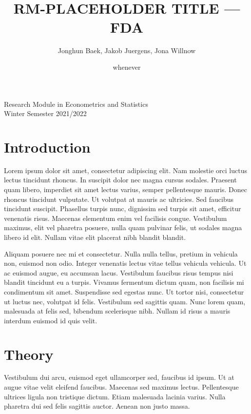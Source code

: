 \documentclass[11pt,twoside,a4paper]{article}
\begin{document}
	\title{{\LARGE RM-PLACEHOLDER TITLE — FDA}}
	\author{Jonghun Baek, Jakob Juergens, Jona Willnow}
	\date{whenever}
	\maketitle
	\vspace{2.5 cm}
	\begin{center}
		Research Module in Econometrics and Statistics \\
		Winter Semester 2021/2022
	\end{center}
	
	\newpage
	
	\tableofcontents
	
	\newpage
	
	\section{Introduction}
	Lorem ipsum dolor sit amet, consectetur adipiscing elit. Nam molestie orci luctus lectus tincidunt rhoncus. In suscipit dolor nec magna cursus sodales. Praesent quam libero, imperdiet sit amet lectus varius, semper pellentesque mauris. Donec rhoncus tincidunt vulputate. Ut volutpat at mauris ac ultricies. Sed faucibus tincidunt suscipit. Phasellus turpis nunc, dignissim sed turpis sit amet, efficitur venenatis risus. Maecenas elementum enim vel facilisis congue. Vestibulum maximus, elit vel pharetra posuere, nulla quam pulvinar felis, ut sodales magna libero id elit. Nullam vitae elit placerat nibh blandit blandit.
	
	Aliquam posuere nec mi et consectetur. Nulla nulla tellus, pretium in vehicula non, euismod non odio. Integer venenatis lectus vitae tellus vehicula vehicula. Ut ac euismod augue, eu accumsan lacus. Vestibulum faucibus risus tempus nisi blandit tincidunt eu a turpis. Vivamus fermentum dictum quam, non facilisis mi condimentum sit amet. Suspendisse sed egestas nunc. Ut tortor nisi, consectetur ut luctus nec, volutpat id felis. Vestibulum sed sagittis quam. Nunc lorem quam, malesuada at felis sed, bibendum scelerisque nibh. Nullam id risus a mauris interdum euismod id quis velit.
	
	\section{Theory}
	Vestibulum dui arcu, euismod eget ullamcorper sed, faucibus id ipsum. Ut at augue vitae velit eleifend faucibus. Maecenas sed maximus lectus. Pellentesque ultrices ligula non tristique dictum. Etiam malesuada lacinia varius. Nulla pharetra dui sed felis sagittis auctor. Aenean non justo massa.
	
\end{document}
